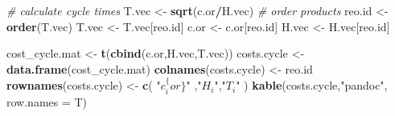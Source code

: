 \documentclass[
]{article}
\newenvironment{Shaded}{\begin{snugshade}}{\end{snugshade}}
\newcommand{\CommentTok}[1]{\textcolor[rgb]{0.56,0.35,0.01}{\textit{#1}}}
\newcommand{\DataTypeTok}[1]{\textcolor[rgb]{0.13,0.29,0.53}{#1}}
\newcommand{\KeywordTok}[1]{\textcolor[rgb]{0.13,0.29,0.53}{\textbf{#1}}}
\newcommand{\NormalTok}[1]{#1}
\newcommand{\OperatorTok}[1]{\textcolor[rgb]{0.81,0.36,0.00}{\textbf{#1}}}
\newcommand{\StringTok}[1]{\textcolor[rgb]{0.31,0.60,0.02}{#1}}
\begin{document}
\begin{Shaded}
\begin{Highlighting}[]
\CommentTok{# calculate cycle times}
\NormalTok{T.vec <-}\StringTok{ }\KeywordTok{sqrt}\NormalTok{(c.or}\OperatorTok{/}\NormalTok{H.vec)}
\CommentTok{# order products}
\NormalTok{reo.id <-}\StringTok{ }\KeywordTok{order}\NormalTok{(T.vec)}
\NormalTok{T.vec <-}\StringTok{ }\NormalTok{T.vec[reo.id]}
\NormalTok{c.or <-}\StringTok{ }\NormalTok{c.or[reo.id]}
\NormalTok{H.vec <-}\StringTok{ }\NormalTok{H.vec[reo.id]}

\NormalTok{cost_cycle.mat <-}\StringTok{ }\KeywordTok{t}\NormalTok{(}\KeywordTok{cbind}\NormalTok{(c.or,H.vec,T.vec))}
\NormalTok{costs.cycle <-}\StringTok{ }\KeywordTok{data.frame}\NormalTok{(cost_cycle.mat)}
\KeywordTok{colnames}\NormalTok{(costs.cycle) <-}\StringTok{ }\NormalTok{reo.id }
\KeywordTok{rownames}\NormalTok{(costs.cycle) <-}\StringTok{ }\KeywordTok{c}\NormalTok{(  }\StringTok{"$c_i^\{or\}$"}\NormalTok{ ,}\StringTok{"$H_i$"}\NormalTok{,}\StringTok{"$T_i$"}\NormalTok{ )}
\KeywordTok{kable}\NormalTok{(costs.cycle,}\StringTok{"pandoc"}\NormalTok{, }\DataTypeTok{row.names =}\NormalTok{ T)}
\end{Highlighting}
\end{Shaded}
\end{document}
